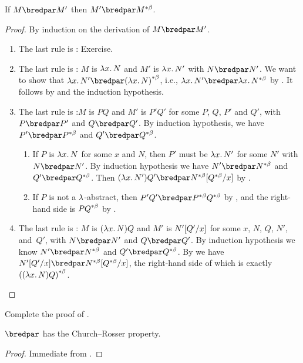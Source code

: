 \documentclass[../../../include/open-logic-section]{subfiles}
\begin{document}
\begin{lem}
  If $M \bredpar M'$ then $M' \bredpar \bcd{M}$.
\end{lem}
\begin{proof}
  By induction on the derivation of $M \bredpar M'$.
  \begin{enumerate}
    \item The last rule is : Exercise.
    \item The last rule is : $M$ is 
      $\lambd[x][N]$ and $M'$ is $\lambd[x][N']$ with
      $N \bredpar N'$. We want to show that $\lambd[x][N'] \bredpar
      \bcd{(\lambd[x][N])}$, i.e., $\lambd[x][N'] \bredpar
      \lambd[x][\bcd{N}]$ by . It follows by
       and the induction hypothesis.
    \item The last rule is :$M$ is $PQ$ and $M'$
      is $P'Q'$ for some $P$, $Q$, $P'$ and $Q'$, with $P \bredpar P'$
      and $Q \bredpar Q'$. By induction hypothesis, we have $P'
      \bredpar \bcd{P}$ and $Q' \bredpar \bcd{Q}$.
      \begin{enumerate}
        \item If $P$ is $\lambd[x][N]$ for some $x$ and $N$, then
          $P'$ must be $\lambd[x][N']$ for some $N'$ with 
          $N \bredpar N'$. By induction hypothesis we have $N' \bredpar \bcd{N}$ and
          $Q' \bredpar \bcd{Q}$. Then $(\lambd[x][N'])Q' \bredpar
          \Subst{\bcd{N}}{\bcd{Q}}{x}$ by .
        \item If $P$ is not a $\lambd$-abstract, then $P'Q' \bredpar
          \bcd{P}\bcd{Q}$ by , and the right-hand
          side is $\bcd{PQ}$ by .
      \end{enumerate}
    \item The last rule is : $M$ is
      $(\lambd[x][N])Q$  and $M'$ is $N'[Q'/x]$ for some $x$,
      $N$, $Q$, $N'$, and~$Q'$, with $N \bredpar N'$ and $Q \bredpar
      Q'$. By induction hypothesis we know $N' \bredpar \bcd{N}$ and
      $Q' \bredpar \bcd{Q}$. By  we have
      $\Subst{N'}{Q'}{x} \bredpar \Subst{\bcd{N}}{\bcd{Q}}{x}$, the
      right-hand side of which is exactly $\bcd{((\lambd[x][N])Q)}$.
  \end{enumerate}
\end{proof}

\begin{prob}
  Complete the proof of .
\end{prob}

\begin{thm}
  $\bredpar$ has the Church--Rosser property.
\end{thm}

\begin{proof}
  Immediate from .
\end{proof}
\end{document}
